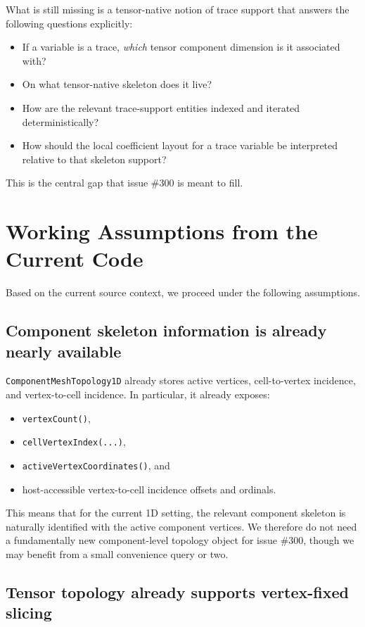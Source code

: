 \documentclass[11pt]{article}
\begin{document}
What is still missing is a tensor-native notion of trace support that answers the following questions explicitly:
\begin{itemize}[leftmargin=2em]
  \item If a variable is a trace, \emph{which} tensor component dimension is it associated with?
  \item On what tensor-native skeleton does it live?
  \item How are the relevant trace-support entities indexed and iterated deterministically?
  \item How should the local coefficient layout for a trace variable be interpreted relative to that skeleton support?
\end{itemize}

This is the central gap that issue \#300 is meant to fill.

\section{Working Assumptions from the Current Code}

Based on the current source context, we proceed under the following assumptions.

\subsection{Component skeleton information is already nearly available}

\texttt{ComponentMeshTopology1D} already stores active vertices, cell-to-vertex incidence, and vertex-to-cell incidence. In particular, it already exposes:
\begin{itemize}[leftmargin=2em]
  \item \texttt{vertexCount()},
  \item \texttt{cellVertexIndex(...)},
  \item \texttt{activeVertexCoordinates()}, and
  \item host-accessible vertex-to-cell incidence offsets and ordinals.
\end{itemize}

This means that for the current 1D setting, the relevant component skeleton is naturally identified with the active component vertices. We therefore do not need a fundamentally new component-level topology object for issue \#300, though we may benefit from a small convenience query or two.

\subsection{Tensor topology already supports vertex-fixed slicing}
\end{document}
